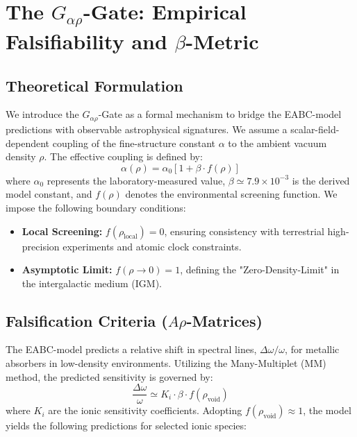 \documentclass{article}
\begin{document}
	
	\section{The $G_{\alpha\rho}$-Gate: Empirical Falsifiability and $\beta$-Metric}
	
	\subsection{Theoretical Formulation}
	We introduce the $G_{\alpha\rho}$-Gate as a formal mechanism to bridge the EABC-model predictions with observable astrophysical signatures. We assume a scalar-field-dependent coupling of the fine-structure constant $\alpha$ to the ambient vacuum density $\rho$. The effective coupling is defined by:
	\begin{equation}
		\alpha(\rho) = \alpha_0 [1 + \beta \cdot f(\rho)]
	\end{equation}
	where $\alpha_0$ represents the laboratory-measured value, $\beta \simeq 7.9 \times 10^{-3}$ is the derived model constant, and $f(\rho)$ denotes the environmental screening function. We impose the following boundary conditions:
	\begin{itemize}
		\item \textbf{Local Screening:} $f(\rho_{\text{local}}) = 0$, ensuring consistency with terrestrial high-precision experiments and atomic clock constraints.
		\item \textbf{Asymptotic Limit:} $f(\rho \to 0) = 1$, defining the "Zero-Density-Limit" in the intergalactic medium (IGM).
	\end{itemize}
	
	\subsection{Falsification Criteria ($A\rho$-Matrices)}
	The EABC-model predicts a relative shift in spectral lines, $\Delta \omega / \omega$, for metallic absorbers in low-density environments. Utilizing the Many-Multiplet (MM) method, the predicted sensitivity is governed by:
	\begin{equation}
		\frac{\Delta \omega}{\omega} \simeq K_i \cdot \beta \cdot f(\rho_{\text{void}})
	\end{equation}
	where $K_i$ are the ionic sensitivity coefficients. Adopting $f(\rho_{\text{void}}) \approx 1$, the model yields the following predictions for selected ionic species:
	
\end{document}
